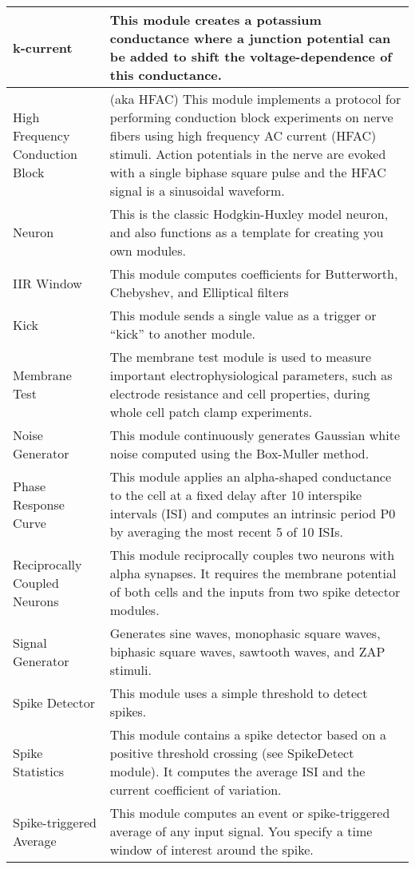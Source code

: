 \begin{longtable}{| p{} | p{} |}
 k-current & This module creates a potassium conductance where a junction potential can be added to shift the voltage-dependence of this conductance.\\\hline
 High Frequency Conduction Block & (aka HFAC) This module implements a protocol for performing conduction block experiments on nerve fibers using high frequency AC current (HFAC) stimuli. Action potentials in the nerve are evoked with a single biphase square pulse and the HFAC signal is a sinusoidal waveform. \\\hline
 Neuron & This is the classic Hodgkin-Huxley model neuron, and also functions as a template for creating you own modules. \\\hline
 IIR Window & This module computes coefficients for Butterworth, Chebyshev, and Elliptical filters \\\hline
 Kick & This module sends a single value as a trigger or ``kick” to another module.\\\hline
 Membrane Test & The membrane test module is used to measure important electrophysiological parameters, such as electrode resistance and cell properties, during whole cell patch clamp experiments. \\\hline
 Noise Generator & This module continuously generates Gaussian white noise computed using the Box-Muller method. \\\hline
 Phase Response Curve & This module applies an alpha-shaped conductance to the cell at a fixed delay after 10 interspike intervals (ISI) and computes an intrinsic period P0 by averaging the most recent 5 of 10 ISIs.\\\hline
 Reciprocally Coupled Neurons & This module reciprocally couples two neurons with alpha synapses. It requires the membrane potential of both cells and the inputs from two spike detector modules. \\\hline
 Signal Generator & Generates sine waves, monophasic square waves, biphasic square waves, sawtooth waves, and ZAP stimuli. \\\hline
 Spike Detector & This module uses a simple threshold to detect spikes. \\\hline
 Spike Statistics & This module contains a spike detector based on a positive threshold crossing (see SpikeDetect module). It computes the average ISI and the current coefficient of variation. \\\hline
 Spike-triggered Average & This module computes an event or spike-triggered average of any input signal. You specify a time window of interest around the spike.\\\hline

\end{longtable}

